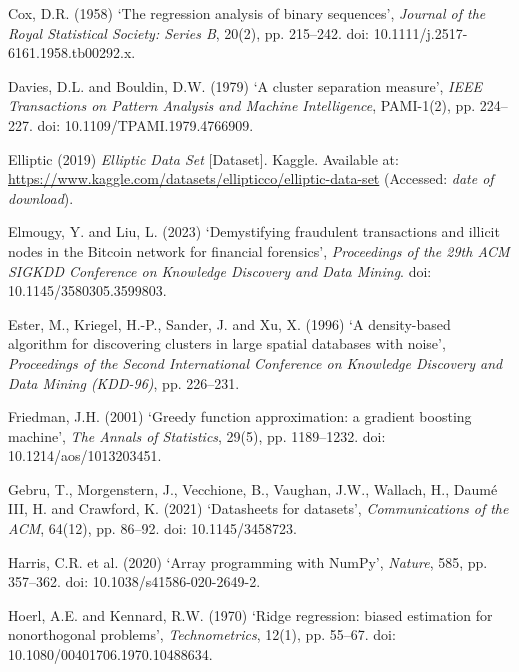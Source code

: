 \begin{references}
\item Cox, D.R. (1958) ‘The regression analysis of binary sequences’, \textit{Journal of the Royal Statistical Society: Series B}, 20(2), pp. 215–242. doi: 10.1111/j.2517-6161.1958.tb00292.x.

\item Davies, D.L. and Bouldin, D.W. (1979) ‘A cluster separation measure’, \textit{IEEE Transactions on Pattern Analysis and Machine Intelligence}, PAMI-1(2), pp. 224–227. doi: 10.1109/TPAMI.1979.4766909.

\item Elliptic (2019) \textit{Elliptic Data Set} [Dataset]. Kaggle. Available at: \url{https://www.kaggle.com/datasets/ellipticco/elliptic-data-set} (Accessed: \textit{date of download}).

\item Elmougy, Y. and Liu, L. (2023) ‘Demystifying fraudulent transactions and illicit nodes in the Bitcoin network for financial forensics’, \textit{Proceedings of the 29th ACM SIGKDD Conference on Knowledge Discovery and Data Mining}. doi: 10.1145/3580305.3599803. \textdagger\ \textdaggerdbl

\item Ester, M., Kriegel, H.-P., Sander, J. and Xu, X. (1996) ‘A density-based algorithm for discovering clusters in large spatial databases with noise’, \textit{Proceedings of the Second International Conference on Knowledge Discovery and Data Mining (KDD-96)}, pp. 226–231.

\item Friedman, J.H. (2001) ‘Greedy function approximation: a gradient boosting machine’, \textit{The Annals of Statistics}, 29(5), pp. 1189–1232. doi: 10.1214/aos/1013203451.

\item Gebru, T., Morgenstern, J., Vecchione, B., Vaughan, J.W., Wallach, H., Daumé III, H. and Crawford, K. (2021) ‘Datasheets for datasets’, \textit{Communications of the ACM}, 64(12), pp. 86–92. doi: 10.1145/3458723.

\item Harris, C.R. et al. (2020) ‘Array programming with NumPy’, \textit{Nature}, 585, pp. 357–362. doi: 10.1038/s41586-020-2649-2.

\item Hoerl, A.E. and Kennard, R.W. (1970) ‘Ridge regression: biased estimation for nonorthogonal problems’, \textit{Technometrics}, 12(1), pp. 55–67. doi: 10.1080/00401706.1970.10488634.


\end{references}
